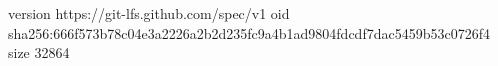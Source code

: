 version https://git-lfs.github.com/spec/v1
oid sha256:666f573b78c04e3a2226a2b2d235fc9a4b1ad9804fdcdf7dac5459b53c0726f4
size 32864
